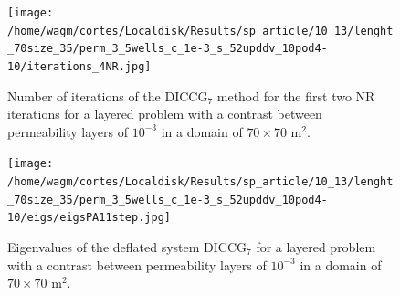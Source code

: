 \documentclass[12pt]{article}
\begin{document}
\begin{figure}[!h]
\centering
\begin{minipage}{.4\textwidth}
\vspace{-0.4cm}
\hspace{-1cm}
\texttt{[image: /home/wagm/cortes/Localdisk/Results/sp\_article/10\_13/lenght\_70size\_35/perm\_3\_5wells\_c\_1e-3\_s\_52upddv\_10pod4-10/iterations\_4NR.jpg]}
\vspace{-1.3cm}
\caption{Number of iterations of the DICCG$_7$ method for the first two NR iterations for a layered problem with a contrast between permeability layers of $10^{-3}$ in a domain of $70 \times 70$ m$^2$.}
\label{fig:NR_D7_3}
\end{minipage}%
\hspace{15mm}
\begin{minipage}{.4\textwidth}
 \centering
\texttt{[image: /home/wagm/cortes/Localdisk/Results/sp\_article/10\_13/lenght\_70size\_35/perm\_3\_5wells\_c\_1e-3\_s\_52upddv\_10pod4-10/eigs/eigsPA11step.jpg]}
\caption{Eigenvalues of the deflated system DICCG$_7$ for a layered problem with a contrast between permeability layers of $10^{-3}$ in a domain of $70 \times 70$ m$^2$.}
\label{fig:eigs_PA7_3}
\end{minipage}
\end{figure}
\newpage
\end{document}
